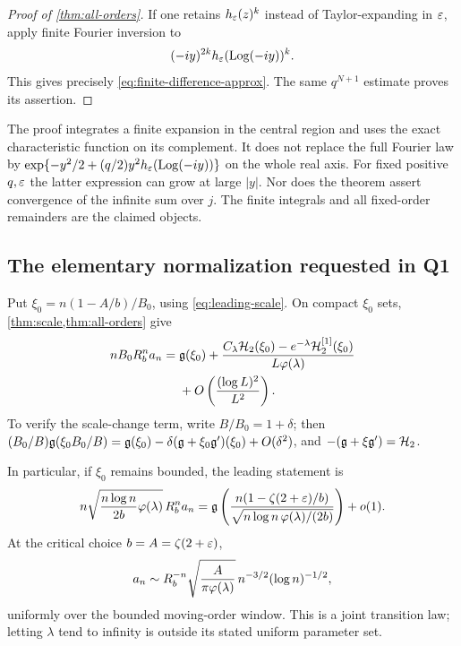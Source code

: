 \begin{proof}[Proof of \cref{thm:all-orders}]
If one retains $h_\varepsilon(z)^k$ instead of Taylor-expanding in
$\varepsilon$, apply finite Fourier inversion to
\[
 (-iy)^{2k}h_\varepsilon(\operatorname{Log}(-iy))^k.
\]
This gives precisely \eqref{eq:finite-difference-approx}. The same
$q^{N+1}$ estimate proves its assertion.
\end{proof}

\begin{remark}
The proof integrates a finite expansion in the central region and
uses the exact characteristic function on its complement. It does not
replace the full Fourier law by
$\exp\{-y^2/2+(q/2)y^2h_\varepsilon(\operatorname{Log}(-iy))\}$ on the whole real axis.
For fixed positive $q,\varepsilon$ the latter expression can grow at large
$|y|$. Nor does the theorem assert convergence of the infinite sum
over $j$. The finite integrals and all fixed-order remainders are the
claimed objects.
\end{remark}

\subsection{The elementary normalization requested in Q1}

Put $\xi_0=n(1-A/b)/B_0$, using \eqref{eq:leading-scale}.
On compact $\xi_0$ sets, \cref{thm:scale,thm:all-orders} give
\begin{equation}\label{eq:elementary-first}
\begin{split}
 nB_0R_b^n a_n={}&\mathfrak g(\xi_0)
   +\frac{C_\lambda\mathcal H_2(\xi_0)
               -e^{-\lambda}\mathcal H_2^{[1]}(\xi_0)}{L\varphi(\lambda)}\\
 &+O\left(\frac{(\log L)^2}{L^2}\right).
\end{split}
\end{equation}
To verify the scale-change term, write
$B/B_0=1+\delta$; then
$(B_0/B)\mathfrak g(\xi_0B_0/B)
=\mathfrak g(\xi_0)-\delta(\mathfrak g+\xi_0\mathfrak g')(\xi_0)+O(\delta^2)$,
and $-(\mathfrak g+\xi\mathfrak g')=\mathcal H_2$.

In particular, if $\xi_0$ remains bounded, the leading statement is
\begin{equation}\label{eq:Q1-solved}
 n\sqrt{\frac{n\log n}{2b}\varphi(\lambda)}\,R_b^n a_n
 =\mathfrak g\left(
 \frac{n(1-\zeta(2+\varepsilon)/b)}{
               \sqrt{n\log n\,\varphi(\lambda)/(2b)}}\right)+o(1).
\end{equation}
At the critical choice $b=A=\zeta(2+\varepsilon)$,
\begin{equation}\label{eq:critical-joint-leading}
 a_n\sim R_b^{-n}
   \sqrt{\frac{A}{\pi\varphi(\lambda)}}\,
                   n^{-3/2}(\log n)^{-1/2},
\end{equation}
uniformly over the bounded moving-order window. This is a joint
transition law; letting $\lambda$ tend to infinity is outside its
stated uniform parameter set.
